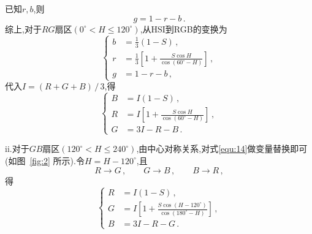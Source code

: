 已知$r,b$,则
\begin{equation}
  g=1-r-b\,.
\end{equation}
综上,对于$RG$扇区$\left(0^{\circ}<H \leqslant 120^{\circ}\right)$,从HSI到RGB的变换为
\begin{equation}
  \left\{
    \begin{aligned}
      b&=\frac{1}{3}(1-S)\,,\\
      r&=\frac{1}{3}\left[1+\frac{S \cos H}{\cos \left(60^{\circ}-H\right)}\right]\,,\\
      g&=1-r-b\,,
    \end{aligned}
  \right.
\end{equation}
代入$I=(R+G+B)\,/\,3$,得
\begin{equation}\label{equ:14}
  \left\{
    \begin{aligned}
      B&=I(1-S)\,,\\
      R&=I\left[1+\frac{S \cos H}{\cos \left(60^{\circ}-H\right)}\right]\,,\\
      G&=3I-R-B\,.
    \end{aligned}
  \right.
\end{equation}

ii.对于$GB$扇区$\left(120^{\circ}<H \leqslant 240^{\circ}\right)$,由中心对称关系,对式\eqref{equ:14}做变量替换即可(如图~\ref{fig:2} 所示).令$H=H-120^{\circ}$,且
$$
R\rightarrow G\,,\qquad G\rightarrow B\,,\qquad B\rightarrow R\,,
$$
得
\begin{equation}
  \left\{
    \begin{aligned}
      R&=I(1-S)\,,\\
      G&=I\left[1+\frac{S \cos\left(H-120^{\circ}\right)}{\cos \left(180^{\circ}-H\right)}\right]\,,\\
      B&=3I-R-G\,.
    \end{aligned}
  \right.
\end{equation}

